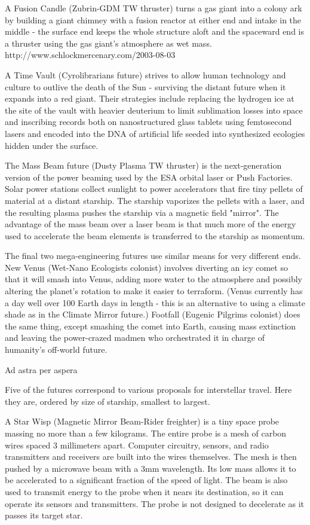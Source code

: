 \documentclass[a4paper]{book}
\begin{document}
A Fusion Candle (Zubrin-GDM TW thruster) turns a gas giant into a colony ark by building a giant chimney with a fusion reactor at either end and intake in the middle - the surface end keeps the whole structure aloft and the spaceward end is a thruster using the gas giant’s atmosphere as wet mass. http://www.schlockmercenary.com/2003-08-03

A Time Vault (Cyrolibrarians future) strives to allow human technology and culture to outlive the death of the Sun - surviving the distant future when it expands into a red giant. Their strategies include replacing the hydrogen ice at the site of the vault with heavier deuterium to limit sublimation losses into space and inscribing records both on nanostructured glass tablets using femtosecond lasers and encoded into the DNA of artificial life seeded into synthesized ecologies hidden under the surface.

The Mass Beam future (Dusty Plasma TW thruster) is the next-generation version of the power beaming used by the ESA orbital laser or Push Factories. Solar power stations collect sunlight to power accelerators that fire tiny pellets of material at a distant starship. The starship vaporizes the pellets with a laser, and the resulting plasma pushes the starship via a magnetic field "mirror". The advantage of the mass beam over a laser beam is that much more of the energy used to accelerate the beam elements is transferred to the starship as momentum.

The final two mega-engineering futures use similar means for very different ends. New Venus (Wet-Nano Ecologists colonist) involves diverting an icy comet so that it will smash into Venus, adding more water to the atmosphere and possibly altering the planet's rotation to make it easier to terraform. (Venus currently has a day well over 100 Earth days in length - this is an alternative to using a climate shade as in the Climate Mirror future.) Footfall (Eugenic Pilgrims colonist) does the same thing, except smashing the comet into Earth, causing mass extinction and leaving the power-crazed madmen who orchestrated it in charge of humanity's off-world future.

Ad astra per aspera

Five of the futures correspond to various proposals for interstellar travel. Here they are, ordered by size of starship, smallest to largest.

A Star Wisp (Magnetic Mirror Beam-Rider freighter) is a tiny space probe massing no more than a few kilograms. The entire probe is a mesh of carbon wires spaced 3 millimeters apart. Computer circuitry, sensors, and radio transmitters and receivers are built into the wires themselves. The mesh is then pushed by a microwave beam with a 3mm wavelength. Its low mass allows it to be accelerated to a significant fraction of the speed of light. The beam is also used to transmit energy to the probe when it nears its destination, so it can operate its sensors and transmitters. The probe is not designed to decelerate as it passes its target star.
\end{document}
